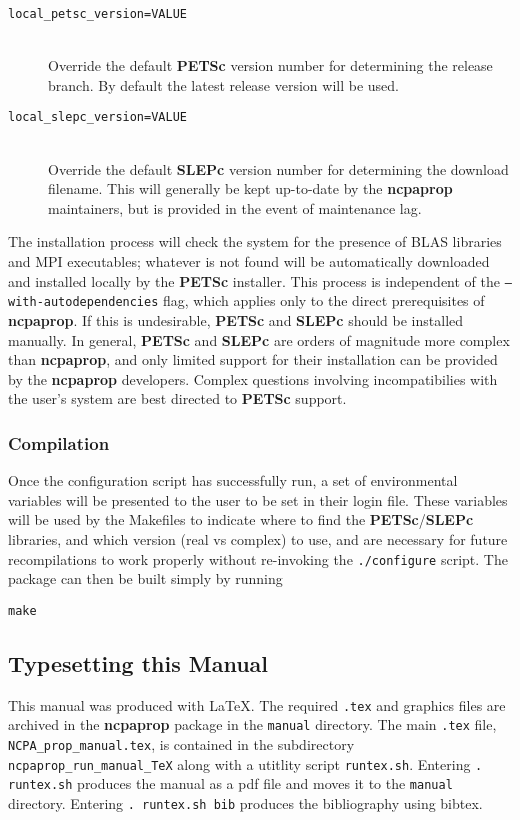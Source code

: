 \begin{description}
\item[\texttt{local\_petsc\_version=VALUE}]\hfill \\
\noindent
Override the default \textbf{PETSc} version number for determining the release branch.  By default the latest release version will be used.

\item[\texttt{local\_slepc\_version=VALUE}]\hfill \\
\noindent
Override the default \textbf{SLEPc} version number for determining the download filename.  This will generally be kept up-to-date by the \textbf{ncpaprop} maintainers, but is provided in the event of maintenance lag.
\end{description}

\noindent The installation process will check the system for the presence of BLAS libraries and MPI executables; whatever is not found will be automatically downloaded and installed locally by the \textbf{PETSc} installer.  This process is independent of the \texttt{--with-autodependencies} flag, which applies only to the direct prerequisites of \textbf{ncpaprop}.  If this is undesirable, \textbf{PETSc} and \textbf{SLEPc} should be installed manually.  In general, \textbf{PETSc} and \textbf{SLEPc} are orders of magnitude more complex than \textbf{ncpaprop}, and only limited support for their installation can be provided by the \textbf{ncpaprop} developers.  Complex questions involving incompatibilies with the user's system are best directed to \textbf{PETSc} support.

\subsubsection{Compilation}

Once the configuration script has successfully run, a set of environmental variables will be presented to the user to be set in their login file.  These variables will be used by the Makefiles to indicate where to find the \textbf{PETSc}/\textbf{SLEPc} libraries, and which version (real vs complex) to use, and are necessary for future recompilations to work properly without re-invoking the \texttt{./configure} script.  The package can then be built simply by running

\texttt{make}


\subsection{Typesetting this Manual}

This manual was produced with LaTeX. The required \verb+.tex+ and graphics files are archived in the \textbf{ncpaprop} package in the \verb+manual+ directory. The main \verb+.tex+ file, \verb+NCPA_prop_manual.tex+, is contained in the subdirectory \verb+ncpaprop_run_manual_TeX+ along with a utitlity script \verb+runtex.sh+. Entering \verb+. runtex.sh+ produces the manual as a pdf file and moves it to the \verb+manual+ directory. Entering \verb+. runtex.sh bib+ produces the bibliography using bibtex. 